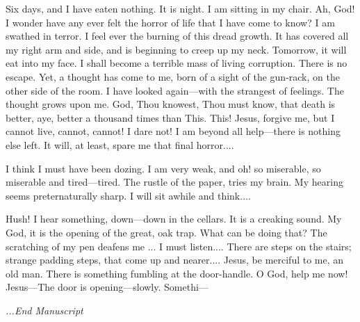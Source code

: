 Six days, and I have eaten nothing. It is night. I am sitting in my chair. Ah, God! I wonder have any ever felt the horror of life that I have come to know? I am swathed in terror. I feel ever the burning of this dread growth. It has covered all my right arm and side, and is beginning to creep up my neck. Tomorrow, it will eat into my face. I shall become a terrible mass of living corruption. There is no escape. Yet, a thought has come to me, born of a sight of the gun-rack, on the other side of the room. I have looked again---with the strangest of feelings. The thought grows upon me. God, Thou knowest, Thou must know, that death is better, aye, better a thousand times than This. This! Jesus, forgive me, but I cannot live, cannot, cannot! I dare not! I am beyond all help---there is nothing else left. It will, at least, spare me that final horror....

I think I must have been dozing. I am very weak, and oh! so miserable, so miserable and tired---tired. The rustle of the paper, tries my brain. My hearing seems preternaturally sharp. I will sit awhile and think....

Hush! I hear something, down---down in the cellars. It is a creaking sound. My God, it is the opening of the great, oak trap. What can be doing that? The scratching of my pen deafens me ... I must listen.... There are steps on the stairs; strange padding steps, that come up and nearer.... Jesus, be merciful to me, an old man. There is something fumbling at the door-handle. O God, help me now! Jesus---The door is opening---slowly. Somethi---

\null
{\centering\textit{...End Manuscript}\par}

\clearpage %
